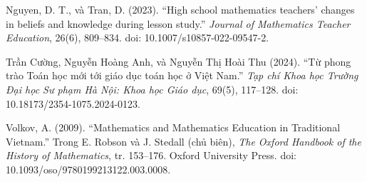Nguyen, D. T., và Tran, D. (2023).
``High school mathematics teachers' changes in beliefs and knowledge during
lesson study.''
\emph{Journal of Mathematics Teacher Education}, 26(6), 809--834.
doi: 10.1007/s10857-022-09547-2.

Trần Cường, Nguyễn Hoàng Anh, và Nguyễn Thị Hoài Thu (2024).
``Từ phong trào Toán học mới tới giáo dục toán học ở Việt Nam.''
\emph{Tạp chí Khoa học Trường Đại học Sư phạm Hà Nội: Khoa học Giáo dục},
69(5), 117--128.
doi: 10.18173/2354-1075.2024-0123.

Volkov, A. (2009).
``Mathematics and Mathematics Education in Traditional Vietnam.''
Trong E. Robson và J. Stedall (chủ biên),
\emph{The Oxford Handbook of the History of Mathematics},
tr. 153--176. Oxford University Press.
doi: 10.1093/oso/9780199213122.003.0008.

\endgroup
